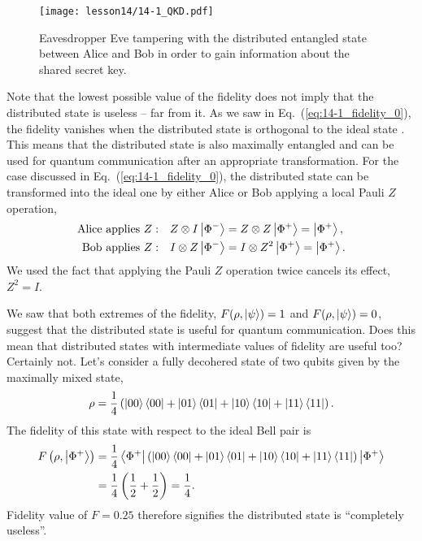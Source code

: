 \begin{figure}[t]
    \centering
    \texttt{[image: lesson14/14-1\_QKD.pdf]}
    \caption[Eavesdropper Eve.]{Eavesdropper Eve tampering with the distributed entangled state between Alice and Bob in order to gain information about the shared secret key.}
    \label{fig:14-1_QKD}
\end{figure}

Note that the lowest possible value of the fidelity does not imply that the distributed state is useless -- far from it.
As we saw in Eq.~(\ref{eq:14-1_fidelity_0}), the fidelity vanishes when the distributed state is orthogonal to the ideal state \ket{\Phi^+}.
This means that the distributed state is also maximally entangled and can be used for quantum communication after an appropriate transformation.
For the case discussed in Eq.~(\ref{eq:14-1_fidelity_0}), the distributed state can be transformed into the ideal one by either Alice or Bob applying a local Pauli $Z$ operation,
\begin{align}
    \text{Alice applies } Z: \quad & Z \otimes I \left| \Phi^- \right\rangle = Z \otimes Z \left| \Phi^+ \right\rangle = \left| \Phi^+ \right\rangle, \\
    \text{Bob applies } Z: \quad & I \otimes Z \left| \Phi^- \right\rangle = I \otimes Z^2 \left| \Phi^+ \right\rangle = \left| \Phi^+ \right\rangle.
\end{align}
We used the fact that applying the Pauli $Z$ operation twice cancels its effect, $Z^2 = I$.

We saw that both extremes of the fidelity, $F(\rho,\left| \psi \right\rangle) = 1$ and $F(\rho,\left| \psi \right\rangle) = 0$, suggest that the distributed state is useful for quantum communication.
Does this mean that distributed states with intermediate values of fidelity are useful too?
Certainly not.
Let's consider a fully decohered state of two qubits given by the maximally mixed state,
\begin{equation}
    \rho = \frac{1}{4} \left( \left| 00 \right\rangle\left\langle 00 \right| + \left| 01 \right\rangle\left\langle 01 \right| + \left| 10 \right\rangle\left\langle 10 \right| + \left| 11 \right\rangle\left\langle 11 \right| \right).
\end{equation}
The fidelity of this state with respect to the ideal Bell pair \ket{\Phi^+} is
\begin{align}
    F \left( \rho, \left| \Phi^+ \right\rangle \right) & = \frac{1}{4} \left\langle \Phi^+ \right| \left( \left| 00 \right\rangle\left\langle 00 \right| + \left| 01 \right\rangle\left\langle 01 \right| + \left| 10 \right\rangle\left\langle 10 \right| + \left| 11 \right\rangle\left\langle 11 \right| \right) \left| \Phi^+ \right\rangle \nonumber\\
    & = \frac{1}{4} \left( \frac{1}{2} + \frac{1}{2} \right) = \frac{1}{4}.
\end{align}
Fidelity value of $F=0.25$ therefore signifies the distributed state is ``completely useless''.


